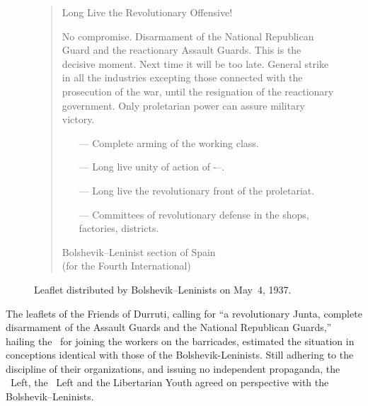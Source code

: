 \begin{figure}

\begin{oframed}
\begin{quote}
  \normalsize

  \bigskip
  
  \begin{center}
  	Long Live the Revolutionary Offensive!
  \end{center}
  
  \bigskip
  
  No compromise. Disarmament of the National Republican Guard and the reactionary Assault Guards. This is the decisive moment. Next time it will be too late. General strike in all the industries excepting those connected with the prosecution of the war, until the resignation of the reactionary government. Only proletarian power can assure military victory.

  \begin{itemize}
  	\raggedright
  	\item[—] Complete arming of the working class.
  	\item[—] Long live unity of action of \CNT-\FAI--\POUM.
  	\item[—] Long live the revolutionary front of the proletariat.
  	\item[—] Committees of revolutionary defense in the shops, factories, districts.
  \end{itemize}

  \medskip
	
  \begin{flushright}
    Bolshevik--Leninist section of Spain \\
    (for the Fourth International)
  \end{flushright}
\end{quote}
\end{oframed}

\caption{Leaflet distributed by Bolshevik--Leninists on May~4, 1937.}
\label{fig:bolshlenleaflet}

\end{figure}

The leaflets of the Friends of Durruti, calling for ``a revolutionary Junta, complete disarmament of the Assault Guards and the National Republican Guards,'' hailing the \POUM\ for joining the workers on the barricades, estimated the situation in conceptions identical with those of the Bolshevik-Leninists. Still adhering to the discipline of their organizations, and issuing no independent propaganda, the \POUM\ Left, the \CNT\ Left and the Libertarian Youth agreed on perspective with the Bolshevik--Leninists.

